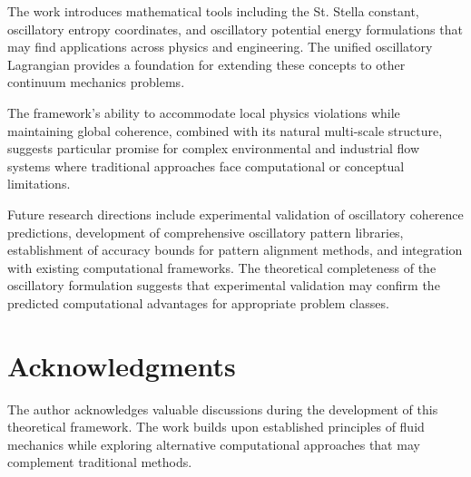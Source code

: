 \documentclass[12pt,a4paper]{article}
\begin{document}
The work introduces mathematical tools including the St. Stella constant, oscillatory entropy coordinates, and oscillatory potential energy formulations that may find applications across physics and engineering. The unified oscillatory Lagrangian provides a foundation for extending these concepts to other continuum mechanics problems.

The framework's ability to accommodate local physics violations while maintaining global coherence, combined with its natural multi-scale structure, suggests particular promise for complex environmental and industrial flow systems where traditional approaches face computational or conceptual limitations.

Future research directions include experimental validation of oscillatory coherence predictions, development of comprehensive oscillatory pattern libraries, establishment of accuracy bounds for pattern alignment methods, and integration with existing computational frameworks. The theoretical completeness of the oscillatory formulation suggests that experimental validation may confirm the predicted computational advantages for appropriate problem classes.

\section{Acknowledgments}

The author acknowledges valuable discussions during the development of this theoretical framework. The work builds upon established principles of fluid mechanics while exploring alternative computational approaches that may complement traditional methods.
\end{document}
